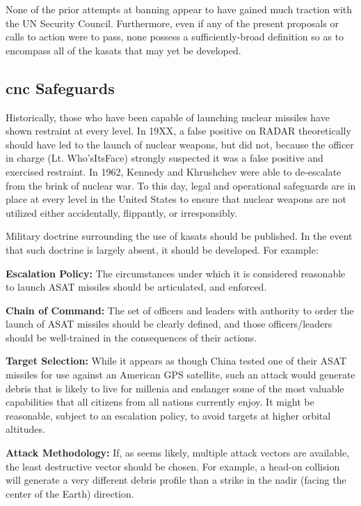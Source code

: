 None of the prior attempts at banning appear to have gained much
traction with the UN Security Council.  Furthermore, even if any of
the present proposals or calls to action were to pass, none possess a
sufficiently-broad definition so as to encompass all of the
\acp{kasat} that may yet be developed.

\subsection{\acf{cnc} Safeguards}
Historically, those who have been capable of launching nuclear
missiles have shown restraint at every level.  In 19XX, a false
positive on RADAR theoretically should have led to the launch of
nuclear weapons, but did not, because the officer in charge
(Lt. Who'sItsFace) strongly suspected it was a false positive and
exercised restraint.\cite{xxx} In 1962, Kennedy and Khrushchev were
able to de-escalate from the brink of nuclear war.  To this day, legal
and operational safeguards are in place at every level in the United
States to ensure that nuclear weapons are not utilized either
accidentally, flippantly, or irresponsibly.

Military doctrine surrounding the use of \acp{kasat} should be
published.  In the event that such doctrine is largely absent, it
should be developed.  For example:

\textbf{Escalation Policy:} The circumstances under which it is
considered reasonable to launch ASAT missiles should be articulated,
and enforced.

\textbf{Chain of Command:} The set of officers and leaders with
authority to order the launch of ASAT missiles should be clearly
defined, and those officers/leaders should be well-trained in the
consequences of their actions.

\textbf{Target Selection:} While it appears as though China tested one
of their ASAT missiles for use against an American GPS satellite, such
an attack would generate debris that is likely to live for millenia
and endanger some of the most valuable capabilities that all citizens
from all nations currently enjoy.  It might be reasonable, subject to
an escalation policy, to avoid targets at higher orbital altitudes.

\textbf{Attack Methodology:} If, as seems likely, multiple attack
vectors are available, the least destructive vector should be chosen.
For example, a head-on collision will generate a very different debris
profile than a strike in the nadir (facing the center of the Earth)
direction.

